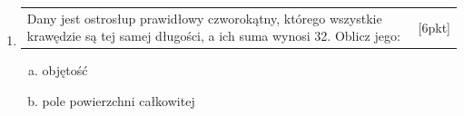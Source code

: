 \documentclass[12pt,a4paper]{article}
\begin{document}
\begin{enumerate}[1.]
		\item  \begin{tabular}{p{13cm} r}
			Dany jest ostrosłup prawidłowy czworokątny, którego wszystkie krawędzie są tej samej długości, a ich suma wynosi 32. Oblicz jego:&[6pkt]\\ 
		\end{tabular}
	\begin{enumerate}[a)]
		\item objętość
		\item pole powierzchni całkowitej
	\end{enumerate}
		
		
		
	\end{enumerate}
	
\end{document}
